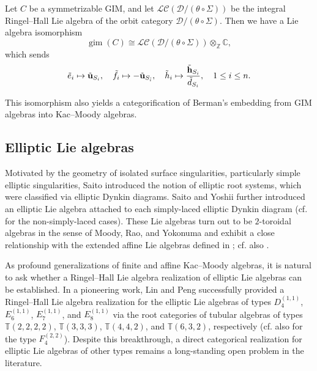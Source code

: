 \documentclass[12pt,reqno]{amsart}
\numberwithin{equation}{section}
\newenvironment{customthm}[1]
{\renewcommand\theinnercustomthm{#1}\innercustomthm}
{\endinnercustomthm}
\newcommand{\gim}{\operatorname{gim}\nolimits}
\begin{document}
	
	\begin{customthm}{{\bf A}}  [Theorem \ref{thm:GIM-via-RH-Lie}]
		\label{customthm:A}
		Let $C$ be a symmetrizable GIM, and let $\mathscr{L}\mathscr{C}(\mathcal{D}/(\theta\circ \Sigma))$ be the integral Ringel--Hall Lie algebra of the orbit category $\mathcal{D}/(\theta\circ\Sigma)$. Then we have a Lie algebra isomorphism
		\[
		\gim(C) \cong \mathscr{L}\mathscr{C}(\mathcal{D}/(\theta\circ \Sigma))\otimes_{\mathbb{Z}}\mathbb{C},
		\]
		which sends
		\[
		\tilde{e}_i\mapsto \tilde{\bf u}_{S_i},\quad \tilde{f}_i\mapsto -\tilde{\bf u}_{S_{\bar{i}}}, \quad\tilde{h}_i\mapsto \frac{\tilde{\bf h}_{S_i}}{\tilde{d}_{S_i}},\quad 1\leq i\leq n.
		\]
	\end{customthm}
	
	This isomorphism also yields a categorification of Berman's embedding from GIM algebras into Kac--Moody algebras.
	
	
	\subsection{Elliptic Lie algebras}
	Motivated by the geometry of isolated surface singularities, particularly simple elliptic singularities, Saito \cite{Sa85} introduced the notion of elliptic root systems, which were classified via elliptic Dynkin diagrams. Saito and Yoshii \cite{SY00} further introduced an elliptic Lie algebra attached to each simply-laced elliptic Dynkin diagram (cf. \cite{Y04} for the non-simply-laced cases). These Lie algebras turn out to be $2$-toroidal algebras in the sense of Moody, Rao, and Yokonuma \cite{MRY90} and exhibit a close relationship with the extended affine Lie algebras defined in \cite{AABGP97}; cf. also \cite{FP10,FP14}.
	
	
	As profound generalizations of finite and affine Kac–Moody algebras, it is natural to ask whether a Ringel–Hall Lie algebra realization of elliptic Lie algebras can be established. In a pioneering work, Lin and Peng \cite{LP05} successfully provided a Ringel–Hall Lie algebra realization for the elliptic Lie algebras of types $D_4^{(1,1)}$, $E_6^{(1,1)}$, $E_7^{(1,1)}$, and $E_8^{(1,1)}$ via the root categories of tubular algebras of types $\mathbb{T}(2,2,2,2)$, $\mathbb{T}(3,3,3)$, $\mathbb{T}(4,4,2)$, and $\mathbb{T}(6,3,2)$, respectively (cf. also \cite{ChL12} for the type $F_4^{(2,2)}$). Despite this breakthrough, a direct categorical realization for elliptic Lie algebras of other types remains a long-standing open problem in the literature.
	
\end{document}
